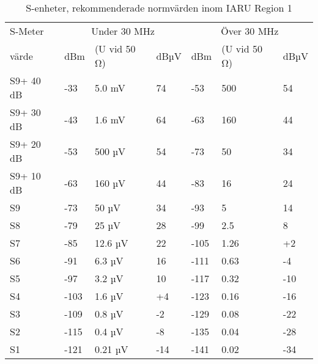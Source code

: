 \begin{table}[h]
  \begin{tabular}{l|lll|lll}
    S-Meter  & \multicolumn{3}{c}{Under 30 MHz} & \multicolumn{3}{c}{Över 30 MHz} \\
    värde    & dBm & (U vid 50 Ω) & dBµV & dBm & (U vid 50 Ω) & dBµV \\
    \hline
    S9+ 40 dB & -33  & 5.0 mV  & 74  & -53  & 500  & 54  \\
    S9+ 30 dB & -43  & 1.6 mV  & 64  & -63  & 160  & 44  \\
    S9+ 20 dB & -53  & 500 µV  & 54  & -73  & 50   & 34  \\
    S9+ 10 dB & -63  & 160 µV  & 44  & -83  & 16   & 24  \\
    S9        & -73  & 50 µV   & 34  & -93  & 5    & 14  \\
    S8        & -79  & 25 µV   & 28  & -99  & 2.5  & 8   \\
    S7        & -85  & 12.6 µV & 22  & -105 & 1.26 & +2  \\
    S6        & -91  & 6.3 µV  & 16  & -111 & 0.63 & -4  \\
    S5        & -97  & 3.2 µV  & 10  & -117 & 0.32 & -10 \\
    S4        & -103 & 1.6 µV  & +4  & -123 & 0.16 & -16 \\
    S3        & -109 & 0.8 µV  & -2  & -129 & 0.08 & -22 \\
    S2        & -115 & 0.4 µV  & -8  & -135 & 0.04 & -28 \\
    S1        & -121 & 0.21 µV & -14 & -141 & 0.02 & -34 \\
  \end{tabular}
  \caption{S-enheter, rekommenderade normvärden inom IARU Region 1}
  \label{s-enhet tabell}
\end{table}

